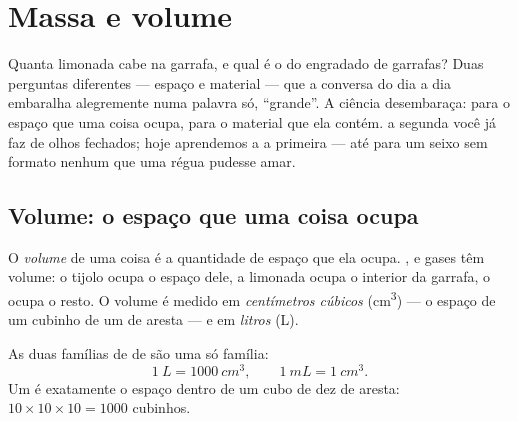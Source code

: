 \chapter{Massa e volume}\label{ch:g6:mass-and-volume}

Quanta limonada cabe na garrafa, e qual é o  do engradado de
garrafas? Duas perguntas diferentes --- espaço e material --- que a
conversa do dia a dia embaralha alegremente numa palavra só,
``grande''. A ciência desembaraça:  para o espaço que uma coisa
ocupa,  para o material que ela contém.  a segunda você já
faz de olhos fechados; hoje aprendemos a  a primeira --- até
para um seixo sem formato nenhum que uma régua pudesse amar.

\section{Volume: o espaço que uma coisa ocupa}

\begin{definition}[Volume]\label{def:g6:mass-and-volume:volume}
O \emph{volume} de uma coisa é a quantidade de espaço
que ela ocupa. ,  e gases têm volume: o tijolo ocupa o
espaço dele, a limonada ocupa o interior da garrafa, o  ocupa o
resto. O volume é medido em \emph{centímetros
cúbicos} (\unit{cm^3}) --- o espaço de um
cubinho de um  de aresta --- e em
\emph{litros} (\unit{L}).
\end{definition}

\begin{proposition}\label{prop:g6:mass-and-volume:litre}
As duas famílias de  de  são uma só família:
\[
\qty{1}{L} = \qty{1000}{cm^3},
\qquad
\qty{1}{mL} = \qty{1}{cm^3}.
\]
Um  é exatamente o espaço dentro de um cubo de dez 
de aresta: $10 \times 10 \times 10 = 1000$ cubinhos.
\end{proposition}

